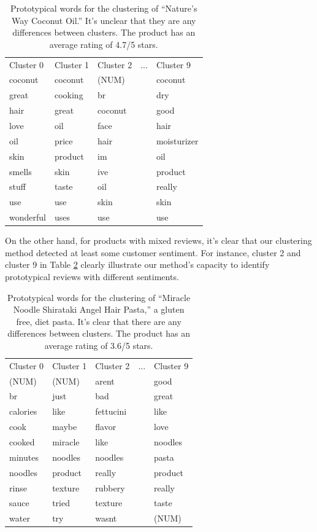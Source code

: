 \documentclass[10pt]{article}
\begin{document}
\begin{table}[h]
\centering
\begin{tabular}{lllll}
Cluster 0 & Cluster 1 & Cluster 2 & ... & Cluster 9   \\
coconut   & coconut   & (NUM)     &     & coconut     \\
great     & cooking   & br        &     & dry         \\
hair      & great     & coconut   &     & good        \\
love      & oil       & face      &     & hair        \\
oil       & price     & hair      &     & moisturizer \\
skin      & product   & im        &     & oil         \\
smells    & skin      & ive       &     & product     \\
stuff     & taste     & oil       &     & really      \\
use       & use       & skin      &     & skin        \\
wonderful & uses      & use       &     & use           
\end{tabular}
\caption{Prototypical words for the clustering of ``Nature's Way Coconut Oil.'' It's unclear that they are any differences between clusters. The product has an average rating of 4.7/5 stars.}
\label{tab:clusterex}
\end{table}

On the other hand, for products with mixed reviews, it's clear that our clustering method detected at least some customer sentiment. For instance, cluster 2 and cluster 9 in Table \ref{tab:clusterex2} clearly illustrate our method's capacity to identify prototypical reviews with different sentiments.

\begin{table}[h]
\centering
\begin{tabular}{lllll}
Cluster 0 & Cluster 1 & Cluster 2 & ... & Cluster 9 \\
(NUM)     & (NUM)     & arent     &     & good      \\
br        & just      & bad       &     & great     \\
calories  & like      & fettucini &     & like      \\
cook      & maybe     & flavor    &     & love      \\
cooked    & miracle   & like      &     & noodles   \\
minutes   & noodles   & noodles   &     & pasta     \\
noodles   & product   & really    &     & product   \\
rinse     & texture   & rubbery   &     & really    \\
sauce     & tried     & texture   &     & taste     \\
water     & try       & wasnt     &     & (NUM)    
\end{tabular}
\caption{Prototypical words for the clustering of ``Miracle Noodle Shirataki Angel Hair Pasta,'' a gluten free, diet pasta. It's clear that there are any differences between clusters. The product has an average rating of 3.6/5 stars.}
\label{tab:clusterex2}
\end{table}
\end{document}
